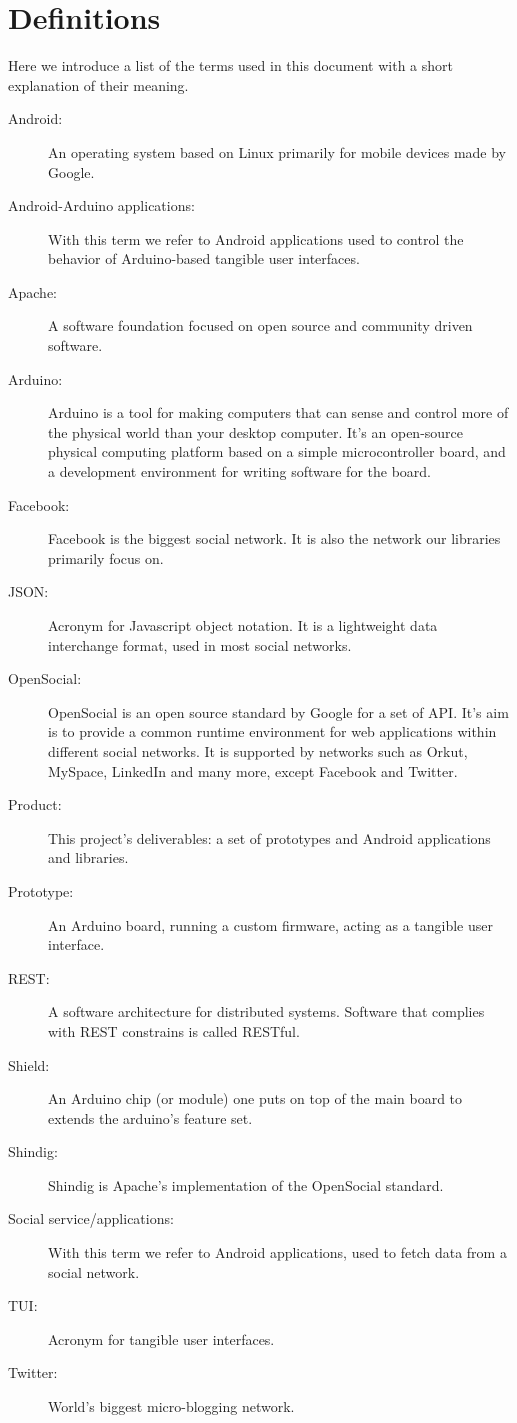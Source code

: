 \section{Definitions}

Here we introduce a list of the terms used in this document with a short explanation of their meaning.

\begin{description}

\item[Android:]
	An operating system based on Linux primarily for mobile devices made by Google.
\item[Android-Arduino applications:]
	With this term we refer to Android applications used to control the behavior of Arduino-based tangible user interfaces.
\item[Apache:]
	A software foundation focused on open source and community driven software.
\item[Arduino:]
	Arduino is a tool for making computers that can sense and control more of the physical world than your
	desktop computer. It's an open-source physical computing platform based on a simple microcontroller board, and a development
	environment for writing software for the board. 
\item[Facebook:]
	Facebook is the biggest social network. It is also the network our libraries primarily focus on.
\item[JSON:]
	Acronym for Javascript object notation. It is a lightweight data interchange format,
	used in most social networks.
\item[OpenSocial:]
	OpenSocial is an open source standard by Google for a set of API. It's aim is to
	provide a common runtime environment for web applications within different social networks. It is supported by networks
	such as Orkut, MySpace, LinkedIn and many more, except Facebook and Twitter.
\item[Product:]
	This project's deliverables: a set of prototypes and Android applications and libraries.
\item[Prototype:]
	An Arduino board, running a custom firmware, acting as a tangible user interface.
\item[REST:]
	A software architecture for distributed systems. Software that complies with REST constrains is called RESTful.
\item[Shield:]
	An Arduino chip (or module) one puts on top of the main board to extends the arduino's feature set.
\item[Shindig:]
	Shindig is Apache's implementation of the OpenSocial standard.
\item[Social service/applications:]
	With this term we refer to Android applications, used to fetch data from a social network.
\item[TUI:]
	Acronym for tangible user interfaces.
\item[Twitter:]
	World's biggest micro-blogging network.
	
\end{description}
